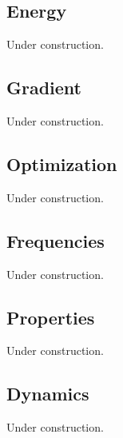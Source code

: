 \subsection{Energy}

Under construction.

\subsection{Gradient}

Under construction.

\subsection{Optimization}

Under construction.

\subsection{Frequencies}

Under construction.

\subsection{Properties}

Under construction.

\subsection{Dynamics}

Under construction.

